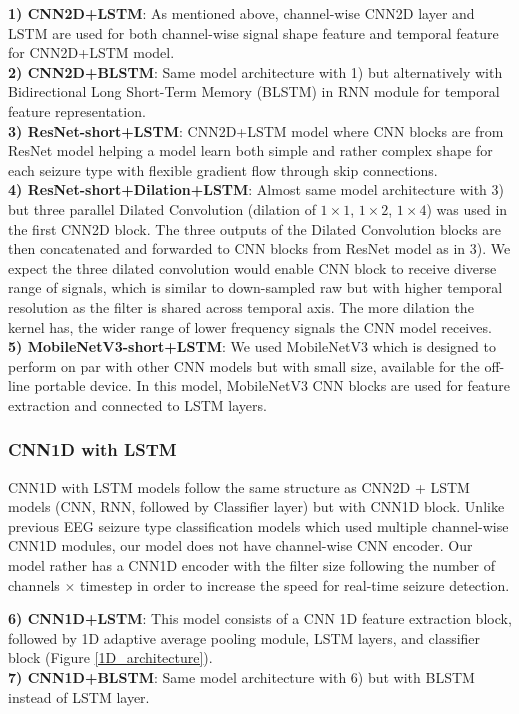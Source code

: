 \documentclass[pmlr,twocolumn,10pt]{jmlr}
\begin{document}
\noindent\textbf{1) CNN2D+LSTM}: As mentioned above, channel-wise CNN2D layer and LSTM are used for both channel-wise signal shape feature and temporal feature for CNN2D+LSTM model.\\
\noindent\textbf{2) CNN2D+BLSTM}: Same model architecture with 1) but alternatively with Bidirectional Long Short-Term Memory (BLSTM) in RNN module for temporal feature representation.\\
\noindent\textbf{3) ResNet-short+LSTM}: CNN2D+LSTM model where CNN blocks are from ResNet model \citep{he2016deep} helping a model learn both simple and rather complex shape for each seizure type with flexible gradient flow through skip connections.\\
\noindent\textbf{4) ResNet-short+Dilation+LSTM}: Almost same model architecture with 3) but three parallel Dilated Convolution (dilation of $1 \times 1$, $1 \times 2$, $1 \times 4$) was used in the first CNN2D block. The three outputs of the Dilated Convolution blocks are then concatenated and forwarded to CNN blocks from ResNet model as in 3). We expect the three dilated convolution would enable CNN block to receive diverse range of signals, which is similar to down-sampled raw \citep{mohsenvand2020contrastive} but with higher temporal resolution as the filter is shared across temporal axis. The more dilation the kernel has, the wider range of lower frequency signals the CNN model receives.\\
\noindent\textbf{5) MobileNetV3-short+LSTM}: We used MobileNetV3 \cite{howard2019searching} which is designed to perform on par with other CNN models but with small size, available for the off-line portable device. In this model, MobileNetV3 CNN blocks are used for feature extraction and connected to LSTM layers. 

\subsubsection{CNN1D with LSTM}
CNN1D with LSTM models follow the same structure as CNN2D + LSTM models (CNN, RNN, followed by Classifier layer) but with CNN1D block. Unlike previous EEG seizure type classification models \citep{priyasad2021interpretable, mohsenvand2020contrastive} which used multiple channel-wise CNN1D modules, our model does not have channel-wise CNN encoder. Our model rather has a CNN1D encoder with the filter size following the number of channels $\times$ timestep in order to increase the speed for real-time seizure detection.

\noindent\textbf{6) CNN1D+LSTM}: This model consists of a CNN 1D feature extraction block, followed by 1D adaptive average pooling module, LSTM layers, and classifier block (Figure \ref{1D_architecture}).\\
\textbf{7) CNN1D+BLSTM}: Same model architecture with 6) but with BLSTM instead of LSTM layer.
\end{document}
